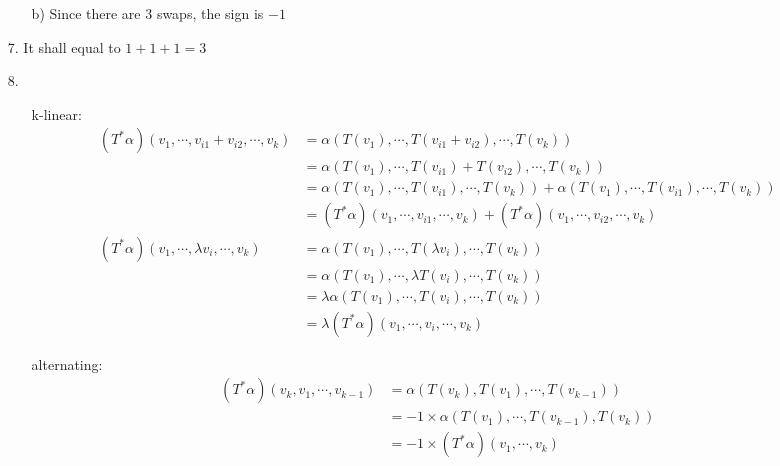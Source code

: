 \documentclass{article}
\begin{document}
\begin{itemize}
\begin{itemize}
        \item [b)] Since there are 3 swaps, the sign is \(-1\)
    \end{itemize}
    \item [7.] It shall equal to \(1+1+1=3\)
    \item [8.] \
    \begin{itemize}
        \item [k-linear:]
        \begin{align*}
            \left(T^*\alpha\right)(v_1,\cdots,v_{i1}+v_{i2},\cdots, v_k)&=\alpha(T(v_1),\cdots,T(v_{i1}+v_{i2}),\cdots,T(v_k))\\
            &=\alpha(T(v_1),\cdots,T(v_{i1})+T(v_{i2}),\cdots,T(v_k))\\
            &=\alpha(T(v_1),\cdots,T(v_{i1}),\cdots,T(v_k))+\alpha(T(v_1),\cdots,T(v_{i1}),\cdots,T(v_k))\\
            &=\left(T^*\alpha\right)(v_1,\cdots,v_{i1},\cdots, v_k)+\left(T^*\alpha\right)(v_1,\cdots,v_{i2},\cdots, v_k)\\
            \left(T^*\alpha\right)(v_1,\cdots,\lambda v_i,\cdots, v_k)&=\alpha(T(v_1),\cdots,T(\lambda v_{i}),\cdots,T(v_k))\\
            &=\alpha(T(v_1),\cdots,\lambda T(v_{i}),\cdots,T(v_k))\\
            &=\lambda\alpha(T(v_1),\cdots,T(v_{i}),\cdots,T(v_k))\\
            &=\lambda \left(T^*\alpha\right)(v_1,\cdots, v_i,\cdots, v_k)
        \end{align*}
        \item [alternating:]
        \begin{align*}
            \left(T^*\alpha\right)(v_k,v_1,\cdots, v_{k-1})&=\alpha (T(v_k),T(v_1),\cdots,T(v_{k-1}))\\
            &=-1\times \alpha (T(v_1),\cdots,T(v_{k-1}),T(v_k))\\
            &=-1\times \left(T^*\alpha\right)(v_1,\cdots, v_k)
        \end{align*}
    \end{itemize}
\end{itemize}
\end{document}
